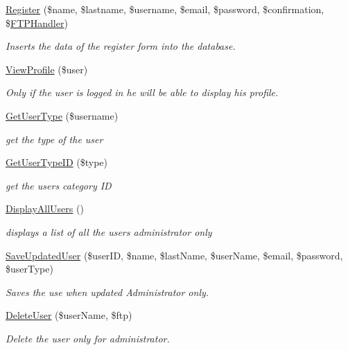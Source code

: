 \begin{DoxyCompactItemize}
\hyperlink{class_user_controller_a73865eeee67d29dd7f3e888bbc8a90cb}{Register} (\$name, \$lastname, \$username, \$email, \$password, \$confirmation, \$\hyperlink{class_f_t_p_handler}{F\+T\+P\+Handler})
\begin{DoxyCompactList}\small\item\em Inserts the data of the register form into the database. \end{DoxyCompactList}\item 
\hyperlink{class_user_controller_aef362c29f717367e1431984a55ec4f4a}{View\+Profile} (\$user)
\begin{DoxyCompactList}\small\item\em Only if the user is logged in he will be able to display his profile. \end{DoxyCompactList}\item 
\hyperlink{class_user_controller_ad14a0bb9938aa18999d1e9b655bb28b1}{Get\+User\+Type} (\$username)
\begin{DoxyCompactList}\small\item\em get the type of the user \end{DoxyCompactList}\item 
\hyperlink{class_user_controller_a74b9734391971e98992763b6554225ac}{Get\+User\+Type\+ID} (\$type)
\begin{DoxyCompactList}\small\item\em get the user\textquotesingle{}s category ID \end{DoxyCompactList}\item 
\hyperlink{class_user_controller_a40926bab092ae93f54e313aed4e8808a}{Display\+All\+Users} ()
\begin{DoxyCompactList}\small\item\em displays a list of all the users administrator only \end{DoxyCompactList}\item 
\hyperlink{class_user_controller_a9717e58fe9e9236723f9bc3e80469288}{Save\+Updated\+User} (\$user\+ID, \$name, \$last\+Name, \$user\+Name, \$email, \$password, \$user\+Type)
\begin{DoxyCompactList}\small\item\em Saves the use when updated Administrator only. \end{DoxyCompactList}\item 
\hyperlink{class_user_controller_a9b7339490577e5e6f88a27de62076b4f}{Delete\+User} (\$user\+Name, \$ftp)
\begin{DoxyCompactList}\small\item\em Delete the user only for administrator. \end{DoxyCompactList}\item 

\end{DoxyCompactItemize}
